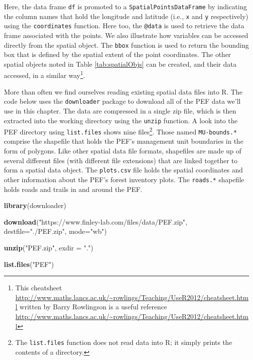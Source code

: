 \documentclass[
]{krantz}
\makeatletter
\newenvironment{Shaded}{\begin{snugshade}}{\end{snugshade}}
\newcommand{\DataTypeTok}[1]{\textcolor[rgb]{0.27,0.27,0.27}{#1}}
\newcommand{\KeywordTok}[1]{\textcolor[rgb]{0.27,0.27,0.27}{\textbf{#1}}}
\newcommand{\NormalTok}[1]{#1}
\newcommand{\StringTok}[1]{\textcolor[rgb]{0.5,0.5,0.5}{#1}}
\newenvironment{kframe}{%
\medskip{}
\setlength{\fboxsep}{.8em}
 \def\at@end@of@kframe{}%
 \ifinner\ifhmode%
  \def\at@end@of@kframe{\end{minipage}}%
  \begin{minipage}{\columnwidth}%
 \fi\fi%
 \def\FrameCommand##1{\hskip\@totalleftmargin \hskip-\fboxsep
 \colorbox{shadecolor}{##1}\hskip-\fboxsep
     \hskip-\linewidth \hskip-\@totalleftmargin \hskip\columnwidth}%
 \MakeFramed {\advance\hsize-\width
   \@totalleftmargin\z@ \linewidth\hsize
   \@setminipage}}%
 {\par\unskip\endMakeFramed%
 \at@end@of@kframe}
\renewenvironment{Shaded}{\begin{kframe}}{\end{kframe}}
\makeatother
\begin{document}
Here, the data frame \texttt{df} is promoted to a \texttt{SpatialPointsDataFrame} by indicating the column names that hold the longitude and latitude (i.e., \texttt{x} and \texttt{y} respectively) using the \texttt{coordinates} function. Here too, the \texttt{@data} is used to retrieve the data frame associated with the points. We also illustrate how variables can be accessed directly from the spatial object. The \texttt{bbox} function is used to return the bounding box that is defined by the spatial extent of the point coordinates. The other spatial objects noted in Table \ref{tab:spatialObjs} can be created, and their data accessed, in a similar way\footnote{This cheatsheet \url{http://www.maths.lancs.ac.uk/~rowlings/Teaching/UseR2012/cheatsheet.html} written by Barry Rowlingson is a useful reference \url{http://www.maths.lancs.ac.uk/~rowlings/Teaching/UseR2012/cheatsheet.html}}.

More than often we find ourselves reading existing spatial data files into R. The code below uses the \texttt{downloader} package to download all of the PEF data we'll use in this chapter. The data are compressed in a single zip file, which is then extracted into the working directory using the \texttt{unzip} function. A look into the PEF directory using \texttt{list.files} shows nine files\footnote{The \texttt{list.files} function does not read data into R; it simply prints the contents of a directory.}. Those named \texttt{MU-bounds.*} comprise the shapefile that holds the PEF's management unit boundaries in the form of polygons. Like other spatial data file formats, shapefiles are made up of several different files (with different file extensions) that are linked together to form a spatial data object. The \texttt{plots.csv} file holds the spatial coordinates and other information about the PEF's forest inventory plots. The \texttt{roads.*} shapefile holds roads and trails in and around the PEF.

\begin{Shaded}
\begin{Highlighting}[]
\KeywordTok{library}\NormalTok{(downloader)}

\KeywordTok{download}\NormalTok{(}\StringTok{"https://www.finley{-}lab.com/files/data/PEF.zip"}\NormalTok{, }
         \DataTypeTok{destfile=}\StringTok{"./PEF.zip"}\NormalTok{, }\DataTypeTok{mode=}\StringTok{"wb"}\NormalTok{) }

\KeywordTok{unzip}\NormalTok{(}\StringTok{"PEF.zip"}\NormalTok{, }\DataTypeTok{exdir =} \StringTok{"."}\NormalTok{)}

\KeywordTok{list.files}\NormalTok{(}\StringTok{"PEF"}\NormalTok{)}
\end{Highlighting}
\end{Shaded}
\end{document}
